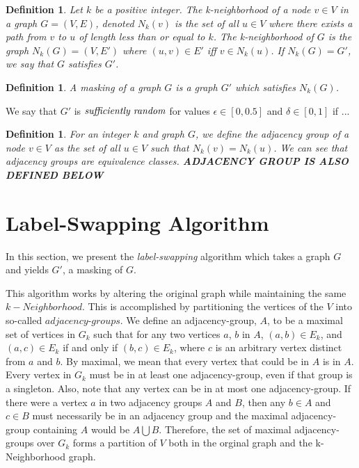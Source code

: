 \documentclass[11pt]{article}
\newtheorem{definition}[thm]{Definition}
\begin{document}
\begin{definition}
Let $k$ be a positive integer. The \emph{k-neighborhood} of a node $v \in V$ in a graph $G = (V,E)$, denoted $N_k(v)$ is the set of all $u \in V$ where there exists a path from $v$ to $u$ of length less than or equal to $k$. The k-neighborhood of $G$ is the graph $N_k(G) = (V, E')$ where $(u,v) \in E'$ iff $v \in N_k(u)$. If $N_k(G) = G'$, we say that $G$ \emph{satisfies} $G'$. 
\end{definition}

\begin{definition}
A \emph{masking} of a graph $G$ is a graph $G'$ which satisfies $N_k(G)$.\\
\end{definition}

\noindent We say that $G'$ is $\emph{sufficiently random}$ for values $\epsilon \in [0, 0.5 ]$ and $\delta \in [0,1]$ if ...



\begin{definition}
For an integer $k$ and graph $G$, we define the \emph{adjacency group} of a node $v \in V$ as the set of all $u \in V$ such that $N_k(v) = N_k(u)$. We can see that adjacency groups are equivalence classes. {\bf ADJACENCY GROUP IS ALSO DEFINED BELOW}
\end{definition}

\section{Label-Swapping Algorithm}
\indent In this section, we present the \emph{label-swapping} algorithm which takes a graph $G$ and yields $G'$, a masking of $G$.

\noindent This algorithm works by altering the original graph while maintaining the same $k-Neighborhood$. This is accomplished by partitioning the vertices of the $V$ into so-called $adjacency$-$groups$.  We define an adjacency-group, $A$, to be a maximal set of vertices in $G_k$ such that for any two vertices $a$, $b$ in $A$, $(a, b) \in E_k$, and $(a, c) \in E_k$  if and only if $(b, c) \in E_k$, where $c$ is an arbitrary vertex distinct from $a$ and $b$. By maximal, we mean that every vertex that could be in $A$ is in $A$. Every vertex in $G_k$ must be in at least one adjacency-group, even if that group is a singleton. Also, note that any vertex can be in at most one adjacency-group. If there were a vertex $a$ in two adjacency groups $A$ and $B$, then any $b \in A$ and $c \in B$ must necessarily be in an adjacency group and the maximal adjacency-group containing $A$ would be $A \bigcup B$. Therefore, the set of maximal adjacency-groups over $G_k$ forms a partition of $V$ both in the orginal graph and the k-Neighborhood graph. 
\end{document}

